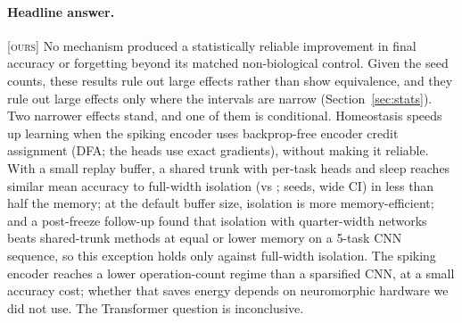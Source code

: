 \documentclass[10pt]{article}
\newcommand{\ours}{\textsc{[ours]}\xspace}
\begin{document}
\paragraph{Headline answer.} \ours No mechanism produced a statistically reliable improvement in final accuracy or
forgetting beyond its matched non-biological control. Given the seed counts, these results rule out large effects
rather than show equivalence, and they rule out large effects only where the intervals are narrow
(Section~\ref{sec:stats}). Two narrower effects stand, and one of them is conditional. Homeostasis speeds up learning
when the spiking encoder uses backprop-free encoder credit assignment (DFA; the heads use exact gradients), without
making it reliable. With a small replay buffer, a shared trunk with per-task heads and sleep reaches similar mean
accuracy to full-width isolation (\smallSnnTwoHundredMean vs \snnIsoMean; \smallSnnTwoHundredN seeds, wide CI) in less
than half the memory; at the default buffer size, isolation is more memory-efficient; and a post-freeze follow-up
found that isolation with quarter-width networks beats shared-trunk methods at equal or lower memory on a 5-task CNN
sequence, so this exception holds only against full-width isolation. The spiking encoder reaches a lower
operation-count regime than a sparsified CNN, at a small accuracy cost; whether that saves energy depends on
neuromorphic hardware we did not use. The Transformer question is inconclusive.
\end{document}
